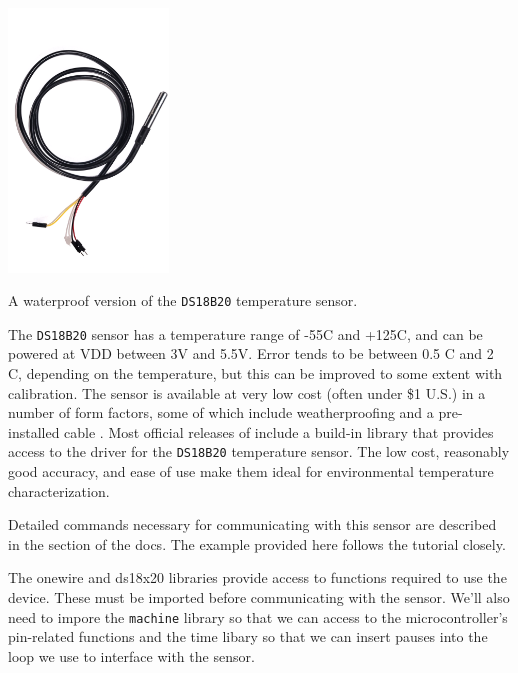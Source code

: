 \begin{marginfigure}[0cm]
	\begin{center}
		\includegraphics[height=7cm]{Images/waterproofDS18B20.png}
		\caption[Waterproofed DS18B20]{A waterproof version of the \texttt{DS18B20} temperature sensor.}
	\end{center}
\end{marginfigure}


The \texttt{DS18B20} sensor has a temperature range of -55\textdegree C and +125\textdegree C, and can be powered at VDD between 3V and 5.5V. Error tends to be between 0.5 \textdegree C and 2 \textdegree C, depending on the temperature, but this can be improved to some extent with calibration.
The sensor is available at very low cost (often under \$1 U.S.) in a number of form factors, some of which include weatherproofing and a pre-installed cable .
Most official releases of \Micropython include a build-in library that provides access to the driver for the \texttt{DS18B20} temperature sensor.
The low cost, reasonably good accuracy, and ease of use make them ideal for environmental temperature characterization.

Detailed commands necessary for communicating with this sensor are described in the  section of the \Micropython docs.  The example provided here follows the tutorial closely.

The onewire and ds18x20 libraries provide access to functions required to use the device.  These must be imported before communicating with the sensor. We'll also need to impore the \texttt{machine} library so that we can access to the microcontroller's pin-related functions and the time libary so that we can insert pauses into the loop we use to interface with the sensor.

